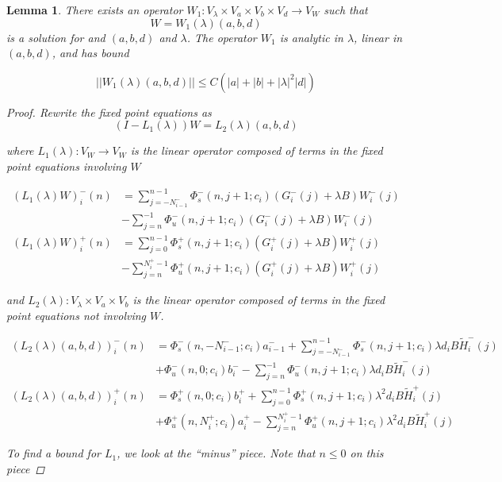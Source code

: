 \documentclass[12pt]{article}
\newtheorem{lemma}{Lemma}
\begin{document}
\begin{lemma}\label{inv1}
There exists an operator $W_1: V_\lambda \times V_a \times V_b \times V_d \rightarrow V_W$ such that
\[
W = W_1(\lambda)(a,b,d)
\]
is a solution for and $(a,b,d)$ and $\lambda$. The operator $W_1$ is analytic in $\lambda$, linear in $(a,b,d)$, and has bound

\begin{equation}\label{W1bound}
||W_1(\lambda)(a,b,d)|| \leq C \left( |a| + |b| + |\lambda|^2 |d| \right)
\end{equation}

\begin{proof}
Rewrite the fixed point equations as
\[
(I - L_1(\lambda))W = L_2(\lambda)(a,b,d)
\]

where $L_1(\lambda): V_W \rightarrow V_W$ is the linear operator composed of terms in the fixed point equations involving $W$

\begin{align*}
(L_1(\lambda)W)_i^-(n) &= \sum_{j = -N_{i-1}^-}^{n-1} \Phi_s^-(n, j+1; c_i)
(G_i^-(j) + \lambda B) W_i^-(j) \\&- \sum_{j = n}^{-1} \Phi_u^-(n, j+1; c_i) 
(G_i^-(j) + \lambda B) W_i^-(j)\\
(L_1(\lambda)W)_i^+(n) &= \sum_{j = 0}^{n-1} \Phi_s^+(n, j+1; c_i) 
(G_i^+(j) + \lambda B) W_i^+(j) \\
&-\sum_{j = n}^{N_i^+-1} \Phi_u^+(n, j+1; c_i) 
(G_i^+(j) + \lambda B) W_i^+(j)
\end{align*}

and $L_2(\lambda): V_\lambda \times V_a \times V_b $ is the linear operator composed of terms in the fixed point equations not involving $W$.

\begin{align*}
(L_2(\lambda)(a,b,d))_i^-(n) &= 
\Phi_s^-(n, -N_{i-1}^-; c_i) a_{i-1}^- + \sum_{j = -N_{i-1}^-}^{n-1} \Phi_s^-(n, j+1; c_i)
\lambda d_i B \tilde{H}_i^-(j)
 \\
&+ \Phi_u^-(n, 0; c_i) b_i^- - \sum_{j = n}^{-1} \Phi_u^-(n, j+1; c_i) 
\lambda d_i B \tilde{H}_i^-(j) \\
(L_2(\lambda)(a,b,d))_i^+(n) &= \Phi_s^+(n, 0; c_i) b_i^+ + \sum_{j = 0}^{n-1} \Phi_s^+(n, j+1; c_i)\lambda^2 d_i B \tilde{H}_i^+(j) \\
&+ \Phi_u^+(n, N_i^+; c_i) a_i^+ - \sum_{j = n}^{N_i^+-1} \Phi_u^+(n, j+1; c_i)\lambda^2 d_i B \tilde{H}_i^+(j)
\end{align*}

To find a bound for $L_1$, we look at the ``minus'' piece. Note that $n \leq 0$ on this piece


\end{proof}
\end{lemma}
\end{document}
